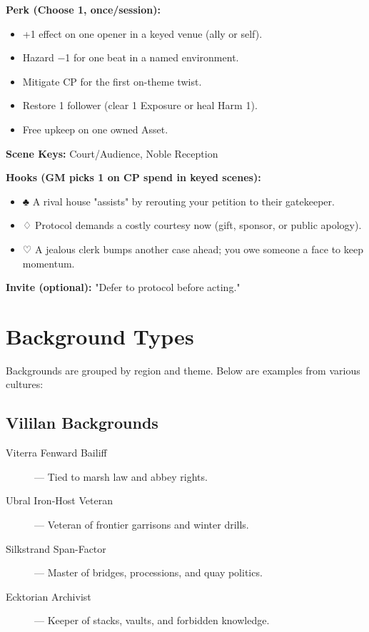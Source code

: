 \textbf{Perk (Choose 1, once/session):}
\begin{itemize}
  \item +1 effect on one opener in a keyed venue (ally or self).
  \item Hazard −1 for one beat in a named environment.
  \item Mitigate CP for the first on-theme twist.
  \item Restore 1 follower (clear 1 Exposure or heal Harm 1).
  \item Free upkeep on one owned Asset.
\end{itemize}

\textbf{Scene Keys:} Court/Audience, Noble Reception

\textbf{Hooks (GM picks 1 on CP spend in keyed scenes):}
\begin{itemize}
  \item ♣ A rival house "assists" by rerouting your petition to their gatekeeper.
  \item ♢ Protocol demands a costly courtesy now (gift, sponsor, or public apology).
  \item ♡ A jealous clerk bumps another case ahead; you owe someone a face to keep momentum.
\end{itemize}

\textbf{Invite (optional):} "Defer to protocol before acting."

\section{Background Types}

Backgrounds are grouped by region and theme. Below are examples from various cultures:

\subsection*{Vililan Backgrounds}

\begin{description}
  \item[Viterra Fenward Bailiff] — Tied to marsh law and abbey rights.
  \item[Ubral Iron-Host Veteran] — Veteran of frontier garrisons and winter drills.
  \item[Silkstrand Span-Factor] — Master of bridges, processions, and quay politics.
  \item[Ecktorian Archivist] — Keeper of stacks, vaults, and forbidden knowledge.
\end{description}

